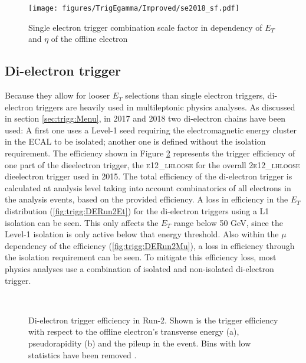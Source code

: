 \begin{figure}[h]
    \centering
 \texttt{[image: figures/TrigEgamma/Improved/se2018\_sf.pdf]}
 \caption{Single electron trigger combination scale factor in dependency of $E_T$ and $\eta$ of the offline electron \label{fig:trigg:SF2018}}
\end{figure}

\subsection{Di-electron trigger}
Because they allow for looser $E_T$ selections than single electron triggers,  di-electron triggers are heavily used in multileptonic physics analyses.  As discussed in section \ref{sec:trigg:Menu},  in 2017 and 2018 two di-electron chains have been used: A first one uses a Level-1 seed requiring the electromagnetic energy cluster in the \ac{ECAL} to be isolated;  another one is defined without the isolation requirement. 
The efficiency shown in Figure \ref{fig:trigg:DERun2} represents the trigger efficiency of one part of the dieelectron trigger,  the \textsc{ e12\_lhloose} for the overall \textsc{ 2e12\_lhloose} dieelectron trigger used in 2015.  The total efficiency of the di-electron trigger is calculated at analysis level taking into account combinatorics of all electrons in the analysis events,  based on the provided efficiency.
A loss in efficiency in the $E_T$ distribution (\ref{fig:trigg:DERun2Et}) for the di-electron triggers using a L1 isolation can be seen. This only affects the $E_T$ range below 50 GeV,  since the Level-1 isolation is only active below that energy threshold. 
Also within the $\mu$ dependency of the efficiency (\ref{fig:trigg:DERun2Mu}),  a loss in efficiency through the isolation requirement can be seen.  To mitigate this efficiency loss,  most physics analyses use a combination of isolated and non-isolated di-electron trigger. 

\begin{figure}[h]\centering
  \\
  \caption{Di-electron trigger efficiency in Run-2.  Shown is the trigger efficiency with respect to the offline electron's transverse energy (a),  pseudorapidity (b) and the pileup in the event. Bins with low statistics have been removed \cite{TrigEgammaPaper}.
  \label{fig:trigg:DERun2}}
\end{figure}

